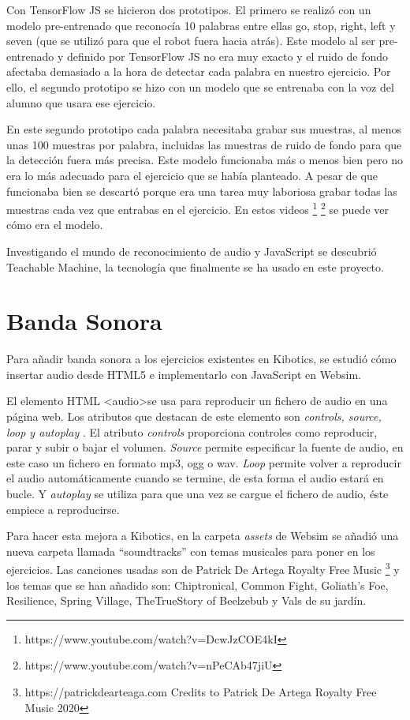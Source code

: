 Con TensorFlow JS se hicieron dos prototipos. El primero se realizó con un modelo pre-entrenado que reconocía 10 palabras entre ellas go, stop, right, left y seven (que se utilizó para que el robot fuera hacia atrás).
Este modelo al ser pre-entrenado y definido por TensorFlow JS no era muy exacto y el ruido de fondo afectaba demasiado a la hora de detectar cada palabra en nuestro ejercicio. Por ello, el segundo prototipo se hizo con un modelo que se entrenaba con la voz del alumno que usara ese ejercicio.

En este segundo prototipo cada palabra necesitaba grabar sus muestras, al menos unas 100 muestras por palabra, incluidas las muestras de ruido de fondo para que la detección fuera más precisa. Este modelo funcionaba más o menos bien pero no era lo más adecuado para el ejercicio que se había planteado. A pesar de que funcionaba bien se descartó porque era una tarea muy laboriosa grabar todas las muestras cada vez que entrabas en el ejercicio. 
En estos videos \footnote{https://www.youtube.com/watch?v=DcwJzCOE4kI}
\footnote{https://www.youtube.com/watch?v=nPeCAb47jiU} se puede ver cómo era el modelo.

Investigando el mundo de reconocimiento de audio y JavaScript se descubrió Teachable Machine, la tecnología que finalmente se ha usado en este proyecto.


\section{Banda Sonora}

Para añadir banda sonora a los ejercicios existentes en Kibotics, se estudió cómo insertar audio desde HTML5 e implementarlo con JavaScript en Websim.

El elemento HTML \textless audio\textgreater  se usa para reproducir un fichero de audio en una página web.
Los atributos que destacan de este elemento son \textit{controls, source, loop y autoplay }.
El atributo \textit{controls} proporciona controles como reproducir, parar y subir o bajar el volumen.
 \textit{Source} permite especificar la fuente de audio, en este caso un fichero en formato mp3, ogg o wav. \textit{Loop} permite volver a reproducir el audio automáticamente cuando se termine, de esta forma  el audio estará en bucle. Y \textit{autoplay} se utiliza para que una vez se cargue el fichero de audio, éste empiece a reproducirse.

Para hacer esta mejora a Kibotics, en la carpeta \textit{assets} de Websim se añadió una nueva carpeta llamada ``soundtracks'' con temas musicales para poner en los ejercicios. Las canciones usadas son de Patrick De Artega Royalty Free Music  \footnote{ https://patrickdearteaga.com Credits to Patrick De Artega Royalty Free Music 2020}
y los temas que se han añadido son:
Chiptronical, Common Fight, Goliath's Foe, Resilience, Spring Village, TheTrueStory of Beelzebub y Vals de su jardín.


